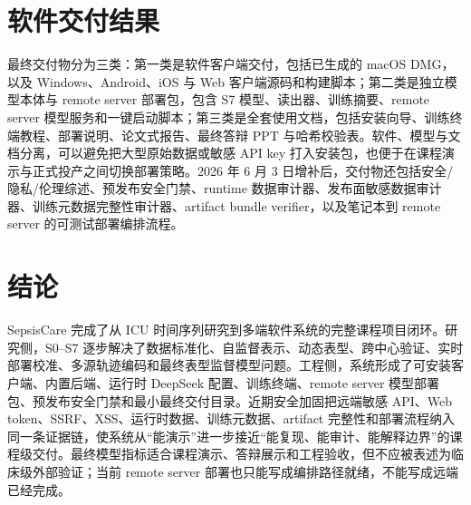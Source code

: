 \documentclass[11pt,a4paper]{article}
\begin{document}
\FloatBarrier
\section{软件交付结果}
最终交付物分为三类：第一类是软件客户端交付，包括已生成的 macOS DMG，以及 Windows、Android、iOS 与 Web 客户端源码和构建脚本；第二类是独立模型本体与 remote server 部署包，包含 S7 模型、读出器、训练摘要、remote server 模型服务和一键启动脚本；第三类是全套使用文档，包括安装向导、训练终端教程、部署说明、论文式报告、最终答辩 PPT 与哈希校验表。软件、模型与文档分离，可以避免把大型原始数据或敏感 API key 打入安装包，也便于在课程演示与正式投产之间切换部署策略。2026 年 6 月 3 日增补后，交付物还包括安全/隐私/伦理综述、预发布安全门禁、runtime 数据审计器、发布面敏感数据审计器、训练元数据完整性审计器、artifact bundle verifier，以及笔记本到 remote server 的可测试部署编排流程。

\section{结论}
SepsisCare 完成了从 ICU 时间序列研究到多端软件系统的完整课程项目闭环。研究侧，S0--S7 逐步解决了数据标准化、自监督表示、动态表型、跨中心验证、实时部署校准、多源轨迹编码和最终表型监督模型问题。工程侧，系统形成了可安装客户端、内置后端、运行时 DeepSeek 配置、训练终端、remote server 模型部署包、预发布安全门禁和最小最终交付目录。近期安全加固把远端敏感 API、Web token、SSRF、XSS、运行时数据、训练元数据、artifact 完整性和部署流程纳入同一条证据链，使系统从“能演示”进一步接近“能复现、能审计、能解释边界”的课程级交付。最终模型指标适合课程演示、答辩展示和工程验收，但不应被表述为临床级外部验证；当前 remote server 部署也只能写成编排路径就绪，不能写成远端已经完成。
\end{document}
